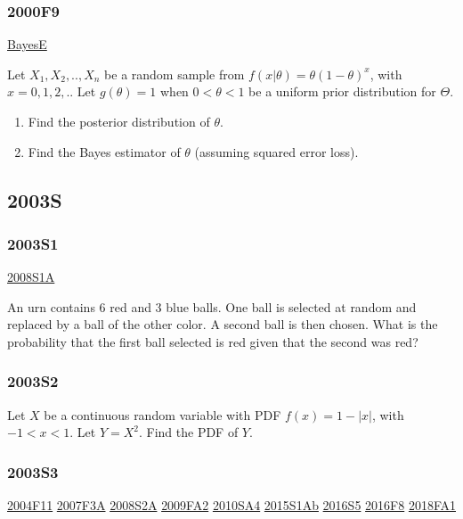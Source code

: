 \documentclass[10pt,twocolumn,portrait]{article}
\begin{document}
\hypertarget{f9}{%
\subsubsection{2000F9}\label{f9}}

\protect\hyperlink{BayesE}{BayesE}

Let \(X_1,X_2,..,X_n\) be a random sample from
\(f(x|\theta)=\theta(1-\theta)^x\), with \(x=0,1,2,..\) Let
\(g(\theta)=1\) when \(0<\theta<1\) be a uniform prior distribution for
\(\Theta\).

\begin{enumerate}
\def\labelenumi{\Alph{enumi})}
\item
  Find the posterior distribution of \(\theta\).
\item
  Find the Bayes estimator of \(\theta\) (assuming squared error loss).
\end{enumerate}

\hypertarget{s}{%
\subsection{2003S}\label{s}}

\hypertarget{s1}{%
\subsubsection{2003S1}\label{s1}}

\protect\hyperlink{s1a}{2008S1A}

An urn contains 6 red and 3 blue balls. One ball is selected at random
and replaced by a ball of the other color. A second ball is then chosen.
What is the probability that the first ball selected is red given that
the second was red?

\hypertarget{s2}{%
\subsubsection{2003S2}\label{s2}}

Let \(X\) be a continuous random variable with PDF \(f(x)=1-|x|\), with
\(-1<x<1\). Let \(Y=X^2\). Find the PDF of \(Y\).

\hypertarget{s3}{%
\subsubsection{2003S3}\label{s3}}

\protect\hyperlink{f11}{2004F11} \protect\hyperlink{f3a}{2007F3A}
\protect\hyperlink{s2a}{2008S2A} \protect\hyperlink{fa2}{2009FA2}
\protect\hyperlink{sa4-1}{2010SA4} \protect\hyperlink{s1ab}{2015S1Ab}
\protect\hyperlink{s5-4}{2016S5} \protect\hyperlink{f8-4}{2016F8}
\protect\hyperlink{fa1-4}{2018FA1}
\end{document}
